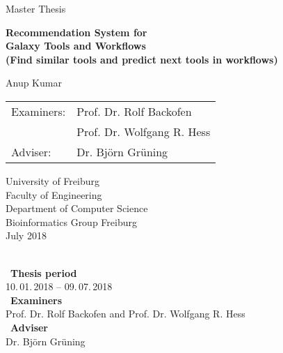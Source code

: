 \begin{titlepage}
\begin{center}

\newcommand{\HorizontalLine}{\rule{\linewidth}{0.3mm}}

{\Large Master Thesis}\\[2cm]


% 
\begin{spacing}{3}
    {\huge \bfseries Recommendation System for } \\
    {\huge \bfseries Galaxy Tools and Workflows } \\
    {\Large \bfseries (Find similar tools and predict next tools in workflows) }\\[2cm]
\end{spacing}


{\Large Anup Kumar } \\[2cm]


\begin{tabular}[hc]{>{\Large}l >{\Large}l}
  Examiners: & Prof. Dr. Rolf Backofen \\[0.3cm]
             & Prof. Dr. Wolfgang R. Hess \\[0.3cm]
  Adviser: & Dr. Björn Grüning \\[2cm]
  
\end{tabular}
\vfill  %

\Large {
    University of Freiburg\\
    Faculty of Engineering\\
    Department of Computer Science\\
    Bioinformatics Group Freiburg \\[0.5cm]
    July 2018
    \\
}
\end{center}
\end{titlepage}

\ \vfill \ \\  %
\
\textbf{Thesis period}            \smallskip{} \\
10.\,01.\,2018 -- 09.\,07.\,2018   \bigskip{} \\
\
\textbf{Examiners}                 \smallskip{} \\
Prof. Dr. Rolf Backofen and Prof. Dr. Wolfgang R. Hess               \bigskip{} \\
\
\textbf{Adviser}                   \smallskip{} \\
Dr. Björn Grüning
